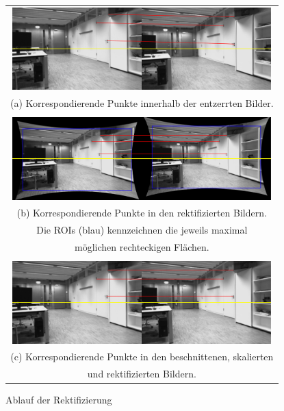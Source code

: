 \begin{figure}[h]
	\centering
	\begin{tabular}{c}
	\includegraphics[width=10cm]{img/calibration/undistort}\\
	\small (a) Korrespondierende Punkte innerhalb der entzerrten Bilder.\\\\
	\includegraphics[width=10cm]{img/calibration/rect_uncropped.pdf}\\
	\small (b) Korrespondierende Punkte in den rektifizierten Bildern. \\Die ROIs (blau) kennzeichnen die jeweils maximal \\möglichen rechteckigen Flächen.\\\\
	\includegraphics[width=10cm]{img/calibration/rect_cropped.pdf}\\
	\small (c) Korrespondierende Punkte in den beschnittenen, skalierten\\ und rektifizierten Bildern. \\
	\end{tabular}
\caption{Ablauf der Rektifizierung}
\label{img:rectification}
\end{figure}

